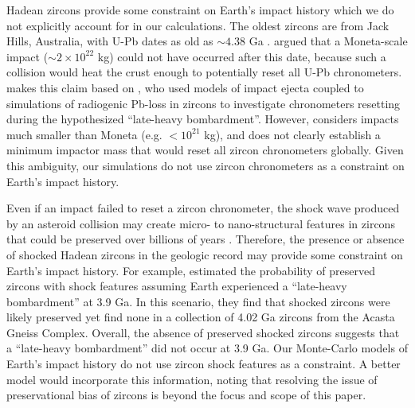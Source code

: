 \documentclass{aastex631}
\begin{document}
Hadean zircons provide some constraint on Earth's impact history which we do not explicitly account for in our calculations. The oldest zircons are from Jack Hills, Australia, with U-Pb dates as old as $\sim 4.38$ Ga \citep{Valley_2014}. \citet{Benner_2020} argued that a Moneta-scale impact ($\sim 2 \times 10^{22}$ kg) could not have occurred after this date, because such a collision would heat the crust enough to potentially reset all U-Pb chronometers. \citet{Benner_2020} makes this claim based on \citet{Abramov_2013}, who used models of impact ejecta coupled to simulations of radiogenic Pb-loss in zircons to investigate chronometers resetting during the hypothesized ``late-heavy bombardment''. However, \citet{Abramov_2013} considers impacts much smaller than Moneta (e.g. $< 10^{21}$ kg), and does not clearly establish a minimum impactor mass that would reset all zircon chronometers globally. Given this ambiguity, our simulations do not use zircon chronometers as a constraint on Earth's impact history.

Even if an impact failed to reset a zircon chronometer, the shock wave produced by an asteroid collision may create micro- to nano-structural features in zircons that could be preserved over billions of years \citep{Reimink_2023}. Therefore, the presence or absence of shocked Hadean zircons in the geologic record may provide some constraint on Earth's impact history. For example, \citet{Reimink_2023} estimated the probability of preserved zircons with shock features assuming Earth experienced a ``late-heavy bombardment'' at 3.9 Ga. In this scenario, they find that shocked zircons were likely preserved yet find none in a collection of 4.02 Ga zircons from the Acasta Gneiss Complex. Overall, the absence of preserved shocked zircons suggests that a ``late-heavy bombardment'' did not occur at 3.9 Ga. Our Monte-Carlo models of Earth's impact history do not use zircon shock features as a constraint. A better model would incorporate this information, noting that resolving the issue of preservational bias of zircons is beyond the focus and scope of this paper.
\end{document}
